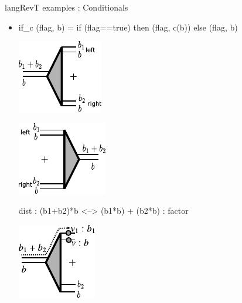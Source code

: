 \documentclass[svgnames,11pt]{beamer}
\begin{document}
\begin{frame}{ {{langRevT}} examples : Conditionals}
  
\begin{itemize}

\item
{{ if_c (flag, b) = if (flag==true) then (flag, c(b)) else (flag, b) }}

\pause
\vfill


\begin{multicols}{2}
\begin{center}
  \includegraphics{diagrams/thesis/dist.pdf}
\end{center}


\begin{center}
  \includegraphics{diagrams/thesis/factor.pdf}
\end{center}
  
\end{multicols}

\begin{center}
  {{dist : (b1+b2)*b <--> (b1*b) + (b2*b) : factor}}
\end{center}


\pause
\vfill

\begin{multicols}{2}
\begin{center}
  \includegraphics{diagrams/thesis/dist-wire-value1.pdf}
\end{center}



\end{multicols}
\end{itemize}
\end{frame}
\end{document}
